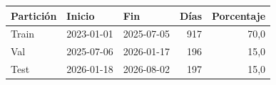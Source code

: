 \begin{tabular}{lllrr}
\toprule
\rowcolor{naranja}
\textbf{Partición} & \textbf{Inicio} & \textbf{Fin} & \textbf{Días} & \textbf{Porcentaje} \\
\midrule
\rowcolor{filaclara} Train & 2023-01-01 & 2025-07-05 & 917 & 70,0 \\
Val & 2025-07-06 & 2026-01-17 & 196 & 15,0 \\
\rowcolor{filaclara} Test & 2026-01-18 & 2026-08-02 & 197 & 15,0 \\
\bottomrule
\end{tabular}
